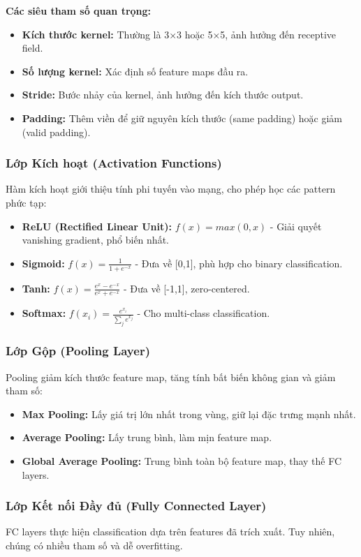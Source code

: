 \textbf{Các siêu tham số quan trọng:}
\begin{itemize}
    \item \textbf{Kích thước kernel:} Thường là 3×3 hoặc 5×5, ảnh hưởng đến receptive field.
    \item \textbf{Số lượng kernel:} Xác định số feature maps đầu ra.
    \item \textbf{Stride:} Bước nhảy của kernel, ảnh hưởng đến kích thước output.
    \item \textbf{Padding:} Thêm viền để giữ nguyên kích thước (same padding) hoặc giảm (valid padding).
\end{itemize}

\subsubsection{Lớp Kích hoạt (Activation Functions)}
Hàm kích hoạt giới thiệu tính phi tuyến vào mạng, cho phép học các pattern phức tạp:
\begin{itemize}
    \item \textbf{ReLU (Rectified Linear Unit):} $f(x) = max(0, x)$ - Giải quyết vanishing gradient, phổ biến nhất.
    \item \textbf{Sigmoid:} $f(x) = \frac{1}{1+e^{-x}}$ - Đưa về [0,1], phù hợp cho binary classification.
    \item \textbf{Tanh:} $f(x) = \frac{e^x - e^{-x}}{e^x + e^{-x}}$ - Đưa về [-1,1], zero-centered.
    \item \textbf{Softmax:} $f(x_i) = \frac{e^{x_i}}{\sum_j e^{x_j}}$ - Cho multi-class classification.
\end{itemize}

\subsubsection{Lớp Gộp (Pooling Layer)}
Pooling giảm kích thước feature map, tăng tính bất biến không gian và giảm tham số:
\begin{itemize}
    \item \textbf{Max Pooling:} Lấy giá trị lớn nhất trong vùng, giữ lại đặc trưng mạnh nhất.
    \item \textbf{Average Pooling:} Lấy trung bình, làm mịn feature map.
    \item \textbf{Global Average Pooling:} Trung bình toàn bộ feature map, thay thế FC layers.
\end{itemize}

\subsubsection{Lớp Kết nối Đầy đủ (Fully Connected Layer)}
FC layers thực hiện classification dựa trên features đã trích xuất. Tuy nhiên, chúng có nhiều tham số và dễ overfitting.

